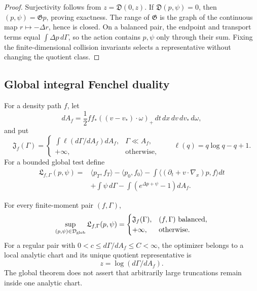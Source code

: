 \begin{proof}
Surjectivity follows from \(z=\mathfrak D(0,z)\).  If
\(\mathfrak D(p,\psi)=0\), then \((p,\psi)=\mathfrak Gp\), proving exactness.
The range of \(\mathfrak G\) is the graph of the continuous map
\(r\mapsto-\Delta r\), hence is closed.  On a balanced pair, the endpoint and
transport terms equal \(\int\Delta p\,d\Gamma\), so the action contains
\(p,\psi\) only through their sum.  Fixing the finite-dimensional collision
invariants selects a representative without changing the quotient class.
\end{proof}

\subsection{Global integral Fenchel duality}

For a density path \(f\), let
\[
dA_f=\frac12ff_*((v-v_*)\cdot\omega)_+
\,dt\,dx\,dv\,dv_*\,d\omega,
\]
and put
\[
\mathfrak J_f(\Gamma)=
\begin{cases}
\displaystyle\int\ell(d\Gamma/dA_f)dA_f,&\Gamma\ll A_f,\\
+\infty,&\text{otherwise},
\end{cases}
\qquad \ell(q)=q\log q-q+1.
\]
For a bounded global test define
\[
\begin{aligned}
\mathfrak L_{f,\Gamma}(p,\psi)={}&
\langle p_T,f_T\rangle-\langle p_0,f_0\rangle
-\int\langle(\partial_t+v\cdot\nabla_x)p,f\rangle dt\\
&+\int\psi\,d\Gamma
-\int(e^{\Delta p+\psi}-1)dA_f.
\end{aligned}
\]

\begin{theorem}
\label{thm:r6-b3-duality}
For every finite-moment pair \((f,\Gamma)\),
\[
\sup_{(p,\psi)\in\mathcal D_{\rm glob}}
\mathfrak L_{f,\Gamma}(p,\psi)
=
\begin{cases}
\mathfrak J_f(\Gamma),&(f,\Gamma)\text{ balanced},\\
+\infty,&\text{otherwise}.
\end{cases}
\]
For a regular pair with
\(0<c\le d\Gamma/dA_f\le C<\infty\), the optimizer belongs to a local
analytic chart and its unique quotient representative is
\[
z=\log(d\Gamma/dA_f).
\]
The global theorem does not assert that arbitrarily large truncations remain
inside one analytic chart.
\end{theorem}

